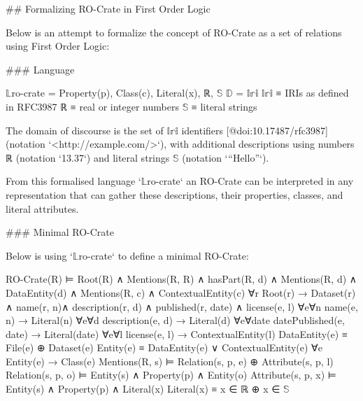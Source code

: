 

\begin{markdown}
## Formalizing RO-Crate in First Order Logic

Below is an attempt to formalize the concept of RO-Crate as a set of relations using First Order Logic:

### Language

\end{markdown}

    $\mathbb{L}$ro-crate = { Property(p), Class(c), Literal(x), ℝ, $\mathbb{S}$ }
    $\mathbb{D}$ =  $\mathbb{Iri}$
    $\mathbb{Iri}$ ≡  { IRIs as defined in RFC3987 }
    ℝ ≡  { real or integer numbers }
    $\mathbb{S}$ ≡  { literal strings }

\begin{markdown}
The domain of discourse is the set of $\mathbb{Iri}$ identifiers [@doi:10.17487/rfc3987] (notation `<http://example.com/>`), with additional descriptions using numbers ℝ (notation `13.37`) and literal strings $\mathbb{S}$ (notation `“Hello”`). 

From this formalised language `$\mathbb{L}$ro-crate` an RO-Crate can be interpreted in any representation that can gather these descriptions, their properties, classes, and literal attributes.  
\end{markdown}

\begin{markdown}
### Minimal RO-Crate

Below is using `$\mathbb{L}$ro-crate` to define a minimal RO-Crate:
\end{markdown}

    RO-Crate(R) ⊨  Root(R) ∧ Mentions(R, R) ∧
        hasPart(R, d) ∧ Mentions(R, d) ∧ DataEntity(d) ∧
        Mentions(R, c) ∧ ContextualEntity(c)
    ∀r Root(r) →  Dataset(r) ∧ name(r, n)∧ description(r, d)
                            ∧ published(r, date) ∧ license(e, l)
    ∀e∀n name(e, n) →  Literal(n)
    ∀e∀d description(e, d) →  Literal(d)
    ∀e∀date datePublished(e, date) →  Literal(date)
    ∀e∀l license(e, l) →  ContextualEntity(l)
    DataEntity(e) ≡  File(e) ⊕ Dataset(e)
    Entity(e) ≡  DataEntity(e) ∨ ContextualEntity(e)
    ∀e Entity(e) → Class(e)
    Mentions(R, s) ⊨  Relation(s, p, e)  ⊕  Attribute(s, p, l)
    Relation(s, p, o) ⊨ Entity(s) ∧ Property(p) ∧ Entity(o)
    Attribute(s, p, x) ⊨ Entity(s)  ∧ Property(p) ∧ Literal(x)
    Literal(x) ≡  x ∈ ℝ  ⊕   x ∈  $\mathbb{S}$

